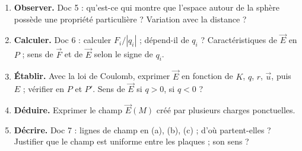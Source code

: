 \documentclass[10pt,a4paper]{article}
\newcommand{\kw}[1]{{\sffamily\bfseries\color{cBlue}#1}}
\newcommand{\vect}[1]{\overrightarrow{#1}}
\begin{document}
\begin{minipage}[t]{0.51\linewidth}\vspace{0pt}\RaggedRight
\begin{enumerate}
  \item \kw{Observer.} Doc 5 : qu’est-ce qui montre que l’espace autour de la sphère possède une propriété particulière ? Variation avec la distance ?
  \item \kw{Calculer.} Doc 6 : calculer $F_i/|q_i|$ ; dépend-il de $q_i$ ? Caractéristiques de $\vect{E}$ en $P$ ; sens de $\vect{F}$ et de $\vect{E}$ selon le signe de $q_i$.
  \item \kw{Établir.} Avec la loi de Coulomb, exprimer $\vect{E}$ en fonction de $K$, $q$, $r$, $\vect{u}$, puis $E$ ; vérifier en $P$ et $P'$. Sens de $\vect{E}$ si $q > 0$, si $q < 0$ ?
  \item \kw{Déduire.} Exprimer le champ $\vect{E}(M)$ créé par plusieurs charges ponctuelles.
  \item \kw{Décrire.} Doc 7 : lignes de champ en (a), (b), (c) ; d’où partent-elles ? Justifier que le champ est uniforme entre les plaques ; son sens ?
\end{enumerate}
\end{minipage}
\end{document}
